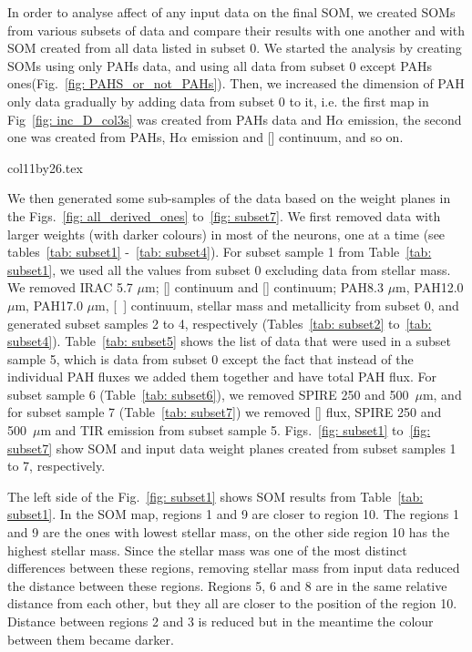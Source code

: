             In order to analyse affect of any input data on the final SOM, we created SOMs from various subsets of data and compare their results with one another and with SOM created from all data listed in subset 0.
            We started the analysis by creating SOMs using only PAHs data, and using all data from subset 0 except PAHs ones(Fig.~\ref{fig: PAHS_or_not_PAHs}). 
            Then, we increased the dimension of PAH only data gradually by adding data from subset 0 to it, i.e. the first map in Fig~\ref{fig: inc_D_col3s} was created from PAHs data and H$\alpha$ emission, the second one was created from PAHs, H$\alpha$ emission and [\sii] continuum, and so on. 

        {col11by26.tex}
        


         We then generated some sub-samples of the data based on the weight planes in the Figs.~\ref{fig: all_derived_ones} to~\ref{fig: subset7}.
        We first removed data with larger weights (with darker colours) in most of the neurons, one at a time (see tables~\ref{tab: subset1} -~\ref{tab: subset4}).
        For subset sample 1 from Table~\ref{tab: subset1}, we used all the values from subset 0 excluding data from stellar mass. 
        We removed IRAC 5.7 $\mu$m; [\sii] continuum and [\oiii] continuum; PAH8.3 $\mu$m, PAH12.0 $\mu$m, PAH17.0 $\mu$m, [~\oiii] continuum, stellar mass and metallicity from subset 0, and generated subset samples 2 to 4, respectively (Tables~\ref{tab: subset2} to~\ref{tab: subset4}).
        Table~\ref{tab: subset5} shows the list of data that were used in a subset sample 5, which is data from subset 0 except the fact that instead of the individual PAH fluxes we added them together and have total PAH flux. 
        For subset sample 6 (Table~\ref{tab: subset6}), we removed SPIRE 250 and 500~$\mu$m, and for subset sample 7 (Table~\ref{tab: subset7}) we removed [\sii] flux, SPIRE 250 and 500~$\mu$m and TIR emission from subset sample 5.
        Figs.~\ref{fig: subset1} to~\ref{fig: subset7} show SOM and input data weight planes created from subset samples 1 to 7, respectively.

        The left side of the Fig.~\ref{fig: subset1} shows SOM results from Table~\ref{tab: subset1}. 
        In the SOM map, regions 1 and 9 are closer to region 10. 
        The regions 1 and 9 are the ones with lowest stellar mass, on the other side region 10 has the highest stellar mass. 
        Since the stellar mass was one of the most distinct differences between these regions, removing stellar mass from input data reduced the distance between these regions.
        Regions 5, 6 and 8 are in the same relative distance from each other, but they all are closer to the position of the region 10.
        Distance between regions 2 and 3 is reduced but in the meantime the colour between them became darker.

